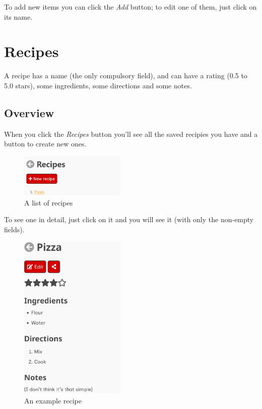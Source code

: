 \documentclass[12pt, a4paper]{report}
\begin{document}
    To add new items you can click the \emph{Add} button; to edit one of them, just click on its name.



    \chapter{Recipes} \label{recipes}

    A recipe has a name (the only compulsory field), and can have a rating (0.5 to 5.0 stars), some ingredients, some directions and some notes.

    \section{Overview}

    When you click the \emph{Recipes} button you'll see all the saved recipies you have and a button to create new ones.

    \begin{figure}[H]
        \centering
        \includegraphics[width=0.45\textwidth]{assets/en/recipes.png}
        \caption{A list of recipes}
    \end{figure}

    To see one in detail, just click on it and you will see it (with only the non-empty fields).

    \begin{figure}[H]
        \centering
        \includegraphics[width=0.45\textwidth]{assets/en/recipe.png}
        \caption{An example recipe}
    \end{figure}
\end{document}
